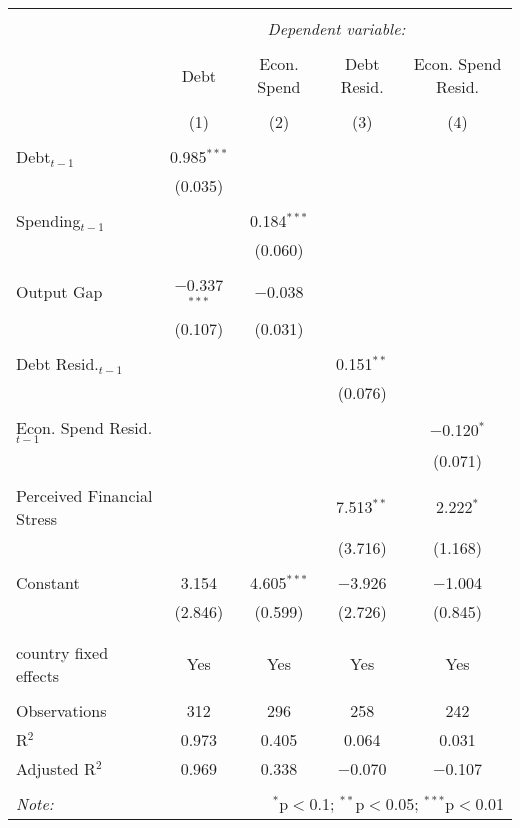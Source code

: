 
\begingroup 
\tiny 
\begin{tabular}{@{\extracolsep{5pt}}lcccc} 
\\[-1.8ex]\hline 
\hline \\[-1.8ex] 
 & \multicolumn{4}{c}{\textit{Dependent variable:}} \\ 
\cline{2-5} 
\\[-1.8ex] & Debt & Econ. Spend & Debt Resid. & Econ. Spend Resid. \\ 
\\[-1.8ex] & (1) & (2) & (3) & (4)\\ 
\hline \\[-1.8ex] 
 Debt$_{t-1}$ & 0.985$^{***}$ &  &  &  \\ 
  & (0.035) &  &  &  \\ 
  & & & & \\ 
 Spending$_{t-1}$ &  & 0.184$^{***}$ &  &  \\ 
  &  & (0.060) &  &  \\ 
  & & & & \\ 
 Output Gap & $-$0.337$^{***}$ & $-$0.038 &  &  \\ 
  & (0.107) & (0.031) &  &  \\ 
  & & & & \\ 
 Debt Resid.$_{t-1}$ &  &  & 0.151$^{**}$ &  \\ 
  &  &  & (0.076) &  \\ 
  & & & & \\ 
 Econ. Spend Resid.$_{t-1}$ &  &  &  & $-$0.120$^{*}$ \\ 
  &  &  &  & (0.071) \\ 
  & & & & \\ 
 Perceived Financial Stress &  &  & 7.513$^{**}$ & 2.222$^{*}$ \\ 
  &  &  & (3.716) & (1.168) \\ 
  & & & & \\ 
 Constant & 3.154 & 4.605$^{***}$ & $-$3.926 & $-$1.004 \\ 
  & (2.846) & (0.599) & (2.726) & (0.845) \\ 
  & & & & \\ 
\hline \\[-1.8ex] 
country fixed effects & Yes & Yes & Yes & Yes \\ 
\hline \\[-1.8ex] 
Observations & 312 & 296 & 258 & 242 \\ 
R$^{2}$ & 0.973 & 0.405 & 0.064 & 0.031 \\ 
Adjusted R$^{2}$ & 0.969 & 0.338 & $-$0.070 & $-$0.107 \\ 
\hline 
\hline \\[-1.8ex] 
\textit{Note:}  & \multicolumn{4}{r}{$^{*}$p$<$0.1; $^{**}$p$<$0.05; $^{***}$p$<$0.01} \\ 
\end{tabular} 
\endgroup 
